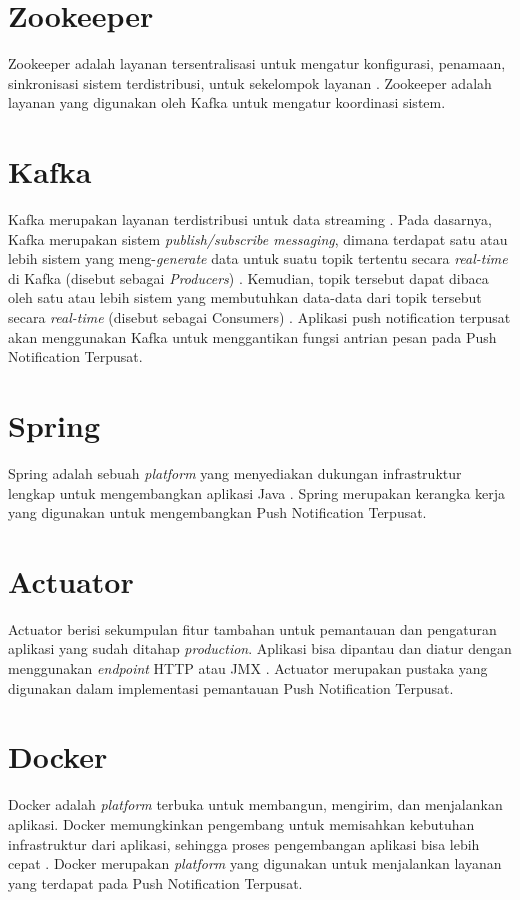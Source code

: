 \section{Zookeeper}
\par Zookeeper adalah layanan tersentralisasi untuk mengatur konfigurasi, penamaan, sinkronisasi sistem terdistribusi, untuk sekelompok layanan \cite{zookeeper-online}. Zookeeper adalah layanan yang digunakan oleh Kafka untuk mengatur koordinasi sistem.

\section{Kafka}
\par Kafka merupakan layanan terdistribusi untuk data streaming \cite{kafka-online}. Pada dasarnya, Kafka merupakan sistem \textit{publish/subscribe messaging}, dimana terdapat satu atau lebih sistem yang meng-\textit{generate} data untuk suatu topik tertentu secara \textit{real-time} di Kafka (disebut sebagai \textit{Producers}) \cite{kafka-online}. Kemudian, topik tersebut dapat dibaca oleh satu atau lebih sistem yang membutuhkan data-data dari topik tersebut secara \textit{real-time} (disebut sebagai Consumers) \cite{kafka-online}. Aplikasi push notification terpusat akan menggunakan Kafka untuk menggantikan fungsi antrian pesan pada Push Notification Terpusat.

\section{Spring}
\par Spring adalah sebuah \textit{platform} yang menyediakan dukungan infrastruktur lengkap untuk mengembangkan aplikasi Java \cite{spring-online}. Spring merupakan kerangka kerja yang digunakan untuk mengembangkan Push Notification Terpusat.

\section{Actuator}
\par Actuator berisi sekumpulan fitur tambahan untuk pemantauan dan pengaturan aplikasi yang sudah ditahap \textit{production}. Aplikasi bisa dipantau dan diatur dengan menggunakan \textit{endpoint} HTTP atau JMX \cite{actuator-online}. Actuator merupakan pustaka yang digunakan dalam implementasi pemantauan Push Notification Terpusat.

\section{Docker}
\par Docker adalah \textit{platform} terbuka untuk membangun, mengirim, dan menjalankan aplikasi. Docker memungkinkan pengembang untuk memisahkan kebutuhan infrastruktur dari aplikasi, sehingga proses pengembangan aplikasi bisa lebih cepat \cite{docker-online}. Docker merupakan \textit{platform} yang digunakan untuk menjalankan layanan yang terdapat pada Push Notification Terpusat.

